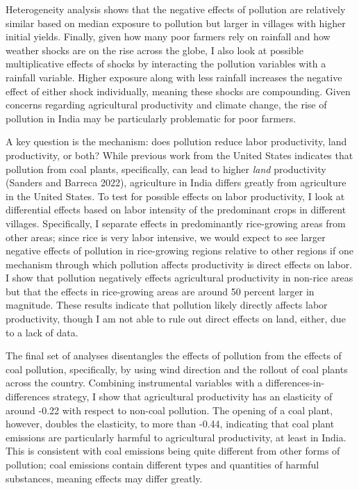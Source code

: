 \documentclass[
]{article}
\begin{document}
Heterogeneity analysis shows that the negative effects of pollution are relatively similar based on median exposure to pollution but larger in villages with higher initial yields. Finally, given how many poor farmers rely on rainfall and how weather shocks are on the rise across the globe, I also look at possible multiplicative effects of shocks by interacting the pollution variables with a rainfall variable. Higher exposure along with less rainfall increases the negative effect of either shock individually, meaning these shocks are compounding. Given concerns regarding agricultural productivity and climate change, the rise of pollution in India may be particularly problematic for poor farmers.

A key question is the mechanism: does pollution reduce labor productivity, land productivity, or both? While previous work from the United States indicates that pollution from coal plants, specifically, can lead to higher \emph{land} productivity (Sanders and Barreca 2022), agriculture in India differs greatly from agriculture in the United States. To test for possible effects on labor productivity, I look at differential effects based on labor intensity of the predominant crops in different villages. Specifically, I separate effects in predominantly rice-growing areas from other areas; since rice is very labor intensive, we would expect to see larger negative effects of pollution in rice-growing regions relative to other regions if one mechanism through which pollution affects productivity is direct effects on labor. I show that pollution negatively effects agricultural productivity in non-rice areas but that the effects in rice-growing areas are around 50 percent larger in magnitude. These results indicate that pollution likely directly affects labor productivity, though I am not able to rule out direct effects on land, either, due to a lack of data.

The final set of analyses disentangles the effects of pollution from the effects of coal pollution, specifically, by using wind direction and the rollout of coal plants across the country. Combining instrumental variables with a differences-in-differences strategy, I show that agricultural productivity has an elasticity of around -0.22 with respect to non-coal pollution. The opening of a coal plant, however, doubles the elasticity, to more than -0.44, indicating that coal plant emissions are particularly harmful to agricultural productivity, at least in India. This is consistent with coal emissions being quite different from other forms of pollution; coal emissions contain different types and quantities of harmful substances, meaning effects may differ greatly.
\end{document}
